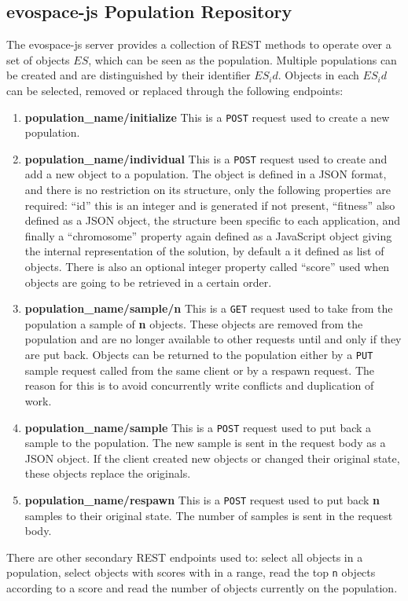 \subsection{{\sf evospace-js} Population Repository} %
\label{sec:evospace}
The {\sf evospace-js} server provides a collection of REST methods  
to operate over a set of objects $ES$, which can be seen as the 
population. Multiple populations can be created and are 
distinguished by their identifier $ES_id$. Objects in each $ES_id$ 
can be selected, removed or replaced through the 
following endpoints:
\begin{enumerate}
    \item {\bf population\_name/initialize} 
    This is a {\tt POST} request used to create a new population.
    \item {\bf population\_name/individual} 
    This is a {\tt POST} request used to create and add a new object
    to a population. The object is defined in a JSON format, 
    and there is no restriction on its structure, only 
    the following properties are required: ``id'' this is an 
    integer and is generated if not present, ``fitness'' also defined 
    as a JSON object, the structure been specific to each application, 
    and finally a ``chromosome'' property again defined as
    a JavaScript object giving the internal representation of 
    the solution, by default a it defined as list of objects. 
    There is also an optional integer property called 
    ``score'' used when objects are going to be retrieved in a certain order.
    \item {\bf population\_name/sample/n}
    This is a {\tt GET}  request used to take from the population a 
    sample of {\bf n} objects. These objects are removed from the 
    population and are no longer available
    to other requests until and only if they are put back. 
    Objects can be returned to the population 
    either by a {\tt PUT} sample request called from the same 
    client or by a respawn request. The reason for 
    this is to avoid concurrently write conflicts and duplication of work.
    \item {\bf population\_name/sample}
    This is a {\tt POST} request used to put back a sample to the population.
    The new sample is sent in the request body as a JSON object. 
    If the client created new objects or 
    changed their original state, these objects replace the originals. 
    \item {\bf population\_name/respawn}
    This is a {\tt POST} request used to put back {\bf n} samples to their 
    original state. The number of samples is sent in the request body. 
\end{enumerate}
There are other secondary REST endpoints used to: select all objects in a 
population, select objects with scores with in a range, read the 
top {\tt n} objects according to a score and read the number of
objects currently on the population.      

